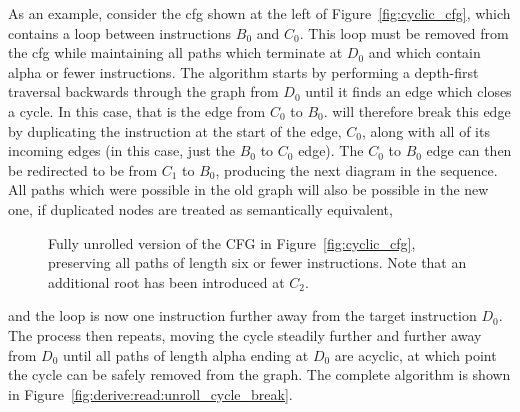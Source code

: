As an example, consider the \gls{cfg} shown at the left of
Figure~\ref{fig:cyclic_cfg}, which contains a loop between
instructions $B_0$ and $C_0$.  This loop must be removed from the
\gls{cfg} while maintaining all paths which terminate at $D_0$ and
which contain \gls{alpha} or fewer instructions.  The algorithm starts
by performing a depth-first traversal backwards through the graph from
$D_0$ until it finds an edge which closes a cycle.  In this case, that
is the edge from $C_0$ to $B_0$.  {\Technique} will therefore break
this edge by duplicating the instruction at the start of the edge,
$C_0$, along with all of its incoming edges (in this case, just the
$B_0$ to $C_0$ edge).  The $C_0$ to $B_0$ edge can then be redirected
to be from $C_1$ to $B_0$, producing the next diagram in the sequence.
All paths which were possible in the old graph will also be possible
in the new one, if duplicated nodes are treated as semantically
equivalent,
\begin{wrapfigure}{r}{3.3cm}
\vspace{-3mm}
\caption{Fully unrolled version of the CFG in
  Figure~\ref{fig:cyclic_cfg}, preserving all paths of length six or
  fewer instructions.  Note that an additional root has been
  introduced at $C_2$.}
\label{fig:unrolled_cyclic_cfg}
\vspace{-20pt}
\end{wrapfigure}
and the loop is now one instruction further away from the target
instruction $D_0$.  The process then repeats, moving the cycle
steadily further and further away from $D_0$ until all paths of length
\gls{alpha} ending at $D_0$ are acyclic, at which point the cycle can
be safely removed from the graph.  The complete algorithm is shown in
Figure~\ref{fig:derive:read:unroll_cycle_break}.


